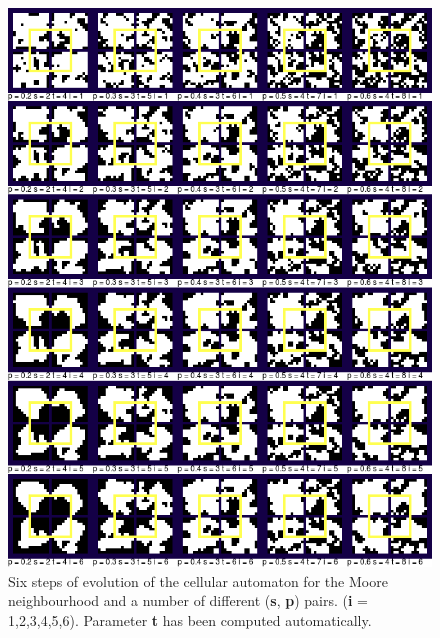 \documentclass[a4paper, 11pt]{article} %
\begin{document}
\begin{figure}[ht]
	\centering
	\includegraphics[width=1.\textwidth]{moore_i}
	\caption{Six steps of evolution of the cellular automaton for the Moore neighbourhood and a number of different (\textbf{s}, \textbf{p}) pairs. (\textbf{i} = 1,2,3,4,5,6). Parameter \textbf{t} has been computed automatically.}
	\label{fig:results1}
\end{figure}
\end{document}
